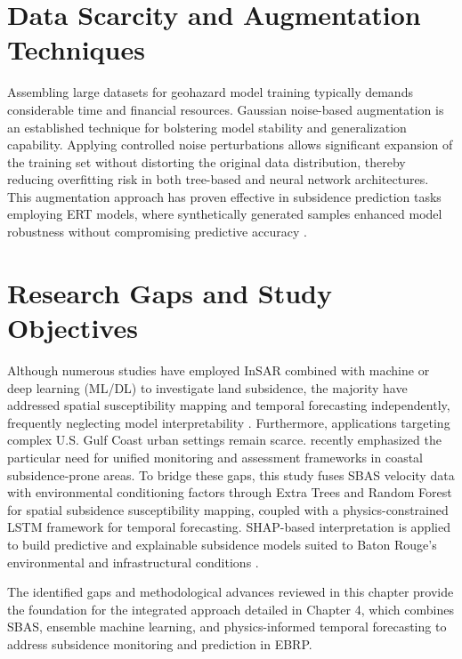 \documentclass[oneside,doublespacing,flushright]{lsuthesis}
\begin{document}
\section{Data Scarcity and Augmentation Techniques}

Assembling large datasets for geohazard model training typically demands considerable time and financial resources. 
Gaussian noise-based augmentation is an established technique for bolstering model stability and generalization capability. 
Applying controlled noise perturbations allows significant expansion of the training set without distorting the original data distribution, 
thereby reducing overfitting risk in both tree-based and neural network architectures. This augmentation approach has proven 
effective in subsidence prediction tasks employing ERT models, where synthetically generated samples enhanced model robustness 
without compromising predictive accuracy \citep{Shorten2019}.

\section{Research Gaps and Study Objectives}

Although numerous studies have employed InSAR combined with machine or deep learning (ML/DL) to investigate land subsidence, the majority have addressed spatial susceptibility mapping and temporal forecasting independently, frequently neglecting model interpretability \citep{Gharechaee2023, Rahmani2024}.
Furthermore, applications targeting complex U.S. Gulf Coast urban settings remain scarce. \citet{HeEtAl2025} recently emphasized the particular need for unified monitoring and assessment frameworks in coastal subsidence-prone areas. 
To bridge these gaps, this study fuses SBAS velocity data with environmental conditioning factors through Extra Trees and Random Forest for spatial subsidence susceptibility mapping, coupled with a physics-constrained LSTM framework for temporal forecasting. 
SHAP-based interpretation is applied to build predictive and explainable subsidence models suited to Baton Rouge's environmental and infrastructural conditions \citep{Abdalla2024, Abdalla2026, Mojtahedi2025}.

The identified gaps and methodological advances reviewed in this chapter provide the foundation for the integrated approach detailed in Chapter 4, which combines SBAS, ensemble machine learning, and physics-informed temporal forecasting to address subsidence monitoring and prediction in EBRP.
\end{document}
